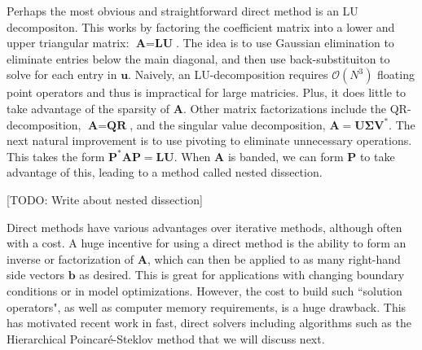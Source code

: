 Perhaps the most obvious and straightforward direct method is an LU decompositon. This works by factoring the coefficient matrix into a lower and upper triangular matrix: $\textbf{A} = \textbf{L} \textbf{U}$. The idea is to use Gaussian elimination to eliminate entries below the main diagonal, and then use back-substituiton to solve for each entry in $\textbf{u}$. Naively, an LU-decomposition requires $\mathcal{O}(N^3)$ floating point operators and thus is impractical for large matricies. Plus, it does little to take advantage of the sparsity of $\textbf{A}$. Other matrix factorizations include the QR-decomposition, $\textbf{A} = \textbf{Q} \textbf{R}$, and the singular value decomposition, $\textbf{A} = \textbf{U} \boldsymbol{\Sigma} \textbf{V}^*$. The next natural improvement is to use pivoting to eliminate unnecessary operations. This takes the form $\textbf{P}^* \textbf{A} \textbf{P} = \textbf{L} \textbf{U}$. When $\textbf{A}$ is banded, we can form $\textbf{P}$ to take advantage of this, leading to a method called nested dissection.

[TODO: Write about nested dissection]

Direct methods have various advantages over iterative methods, although often with a cost. A huge incentive for using a direct method is the ability to form an inverse or factorization of $\textbf{A}$, which can then be applied to as many right-hand side vectors $\textbf{b}$ as desired. This is great for applications with changing boundary conditions or in model optimizations. However, the cost to build such ``solution operators", as well as computer memory requirements, is a huge drawback. This has motivated recent work in fast, direct solvers including algorithms such as the Hierarchical Poincaré-Steklov method that we will discuss next.
